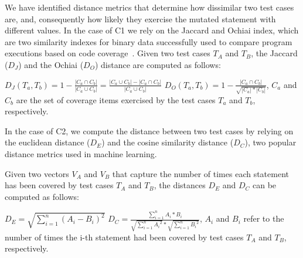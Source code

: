 We have identified distance metrics that determine how dissimilar two test cases are, and, consequently how likely they exercise the mutated statement with different values. In the case of C1 we rely on the Jaccard and Ochiai index, which are two similarity indexes for binary data successfully used to compare program executions based on code coverage~\cite{Zou:Ochiai:2019,Keller:Jaccard:2017,Briand:2019}. 
Given two test cases $T_A$ and $T_B$, the Jaccard  ($D_J$) and the Ochiai ($D_O$) distance are computed as follows:

$D_J(T_a,T_b)=1-\frac{|C_a \cap C_b|}{|C_a \cup C_b|}=\frac{|C_a \cup C_b|-|C_a \cap C_b|}{|C_a \cup C_b|}$ \hspace{5mm} $D_O(T_a,T_b)=1-\frac{|C_a \cap C_b|}{\sqrt{|C_a| * |C_b|}}$, 
$C_a$ and $C_b$ are the set of coverage items exercised by the test cases $T_a$ and $T_b$, respectively.

In the case of C2, we compute the distance between two test cases by relying on the euclidean distance ($D_E$) and the cosine similarity distance ($D_C$), two popular distance metrics used in machine learning. 

Given two vectors $V_A$ and $V_B$ that capture the number of times each statement has been covered by test cases $T_A$ and $T_B$, the distances $D_E$ and $D_C$ can be computed as follows:

$D_E=\sqrt{\sum_{i=1}^{n}(A_i-B_i)^2}$ 
$D_C= \frac{\sum_{i=1}^{n}A_i*B_i}{\sqrt{\sum_{i=1}^{n}{A_i}^2}*\sqrt{\sum_{i=1}^{n}{B_i}^2}}$,
$A_i$ and $B_i$ refer to the number of times the i-th statement had been covered by test cases $T_A$ and $T_B$, respectively.

